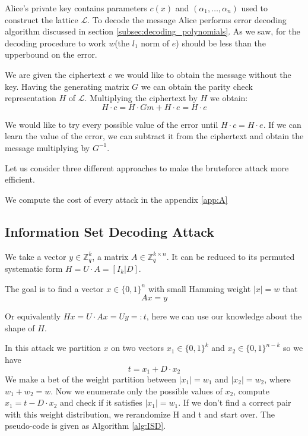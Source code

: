 \documentclass[12pt]{article}
\newcommand{\ZZ}{\mathbb{Z}}
\newcommand{\LL}{\mathcal{L}}
\begin{document}
Alice's private key contains parameters $c(x)$ and $(\alpha_1, \dots, \alpha_n)$ used to construct the lattice $\LL$. To decode the message Alice performs error decoding algorithm discussed in section \ref{subsec:decoding_polynomials}. As we saw, for the decoding procedure to work $w$(the $l_1$ norm of $e$) should be less than the upperbound on the error.

We are given the ciphertext $c$ we would like to obtain the message without the key. Having the generating matrix $G$ we can obtain the parity check representation $H$ of $\LL$. Multiplying the ciphertext by $H$ we obtain:
\[
    H \cdot c = H \cdot Gm + H \cdot e = H \cdot e
\]

We would like to try every possible value of the error until $H \cdot c = H \cdot e$. If we can learn the value of the error, we can subtract it from the ciphertext and obtain the message multiplying by $G^{-1}$.

Let us consider three different approaches to make the bruteforce attack more efficient.

We compute the cost of every attack in the appendix \ref{app:A}


\subsection{Information Set Decoding Attack}

We take a vector $y \in \ZZ_q^{k}$, a matrix $A \in \ZZ_q^{k \times n}$. It can be reduced to its permuted systematic form $H  = U \cdot A = [I_{k}|D]$.


The goal is to find a vector $x \in \{0,1\}^{n}$ with small Hamming weight $|x| = w$ that
\[
Ax = y
\]

Or equivalently $Hx = U\cdot Ax = Uy =: t$, here we can use our knowledge about the shape of $H$.

In this attack we partition $x$ on two vectors $x_1 \in \{0,1\}^{k}$ and  $x_2  \in \{0,1\}^{n-k}$ so we have
\[
t = x_1 + D \cdot x_2
\]
We make a bet of the weight partition between $|x_1| = w_1$ and $|x_2| = w_2$, where $w_1 + w_2 = w$. Now we enumerate only the possible values of $x_2$, compute $x_1 = t - D \cdot x_2$ and check if it satisfies $|x_1| = w_1$. If we don't find a correct pair with this weight distribution, we rerandomize H and t and start over. The pseudo-code is given as Algorithm \ref{alg:ISD}.
\end{document}
